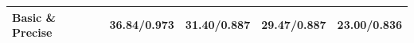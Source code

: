 \begin{tabular}{lllll}
\toprule
Basic \& Precise & 36.84/0.973 & 31.40/0.887 & 29.47/0.887 & 23.00/0.836 \\
\midrule
\bottomrule
\end{tabular}
